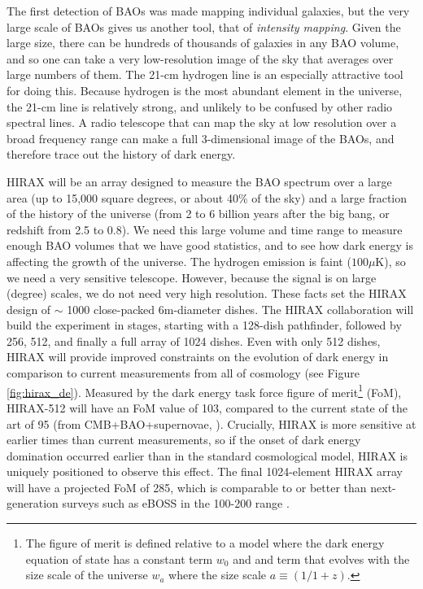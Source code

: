 \documentclass[11pt]{article}
\begin{document}
The first detection of BAOs \citep{Eisenstein05} was made mapping
individual galaxies, but the very large scale of BAOs gives us another
tool, that of {\textit{intensity mapping}}.  Given the large size,
there can be hundreds of thousands of galaxies in any BAO volume, and
so one can take a very low-resolution image of the sky that averages
over large numbers of them.  The 21-cm hydrogen line is an especially
attractive tool for doing this.  Because hydrogen is the most abundant
element in the universe, the 21-cm line is relatively strong, and
unlikely to be confused by other radio spectral lines.  A radio
telescope that can map the sky at low resolution over a broad
frequency range can make a full 3-dimensional image of the BAOs, and
therefore trace out the history of dark energy.

HIRAX will be an array designed to measure the BAO spectrum over a
large area (up to 15,000 square degrees, or about 40\% of the sky) and
a large fraction of the history of the universe (from 2 to 6 billion
years after the big bang, or redshift from 2.5 to 0.8).  We need this
large volume and time range to measure enough BAO volumes that we have
good statistics, and to see how dark energy is affecting the growth of
the universe.  The hydrogen emission is faint ($100 \mu \mathrm{K}$),
so we need a very sensitive telescope.  However, because the signal is
on large (degree) scales, we do not need very high resolution.  These
facts set the HIRAX design of $\sim$ 1000 close-packed 6m-diameter
dishes.  The HIRAX collaboration will build the experiment in stages,
starting with a 128-dish pathfinder, followed by 256, 512, and finally a
full array of 1024 dishes.  Even with only 512 dishes, HIRAX will
provide improved constraints on the evolution of dark energy in
comparison to current measurements from all of cosmology (see Figure
\ref{fig:hirax_de}).  Measured by the dark energy task force figure of
merit\footnote{The figure of merit is defined relative to a model
  where the dark energy equation of state has a constant term $w_0$
  and and term that evolves with the size scale of the universe $w_a$
  where the size scale $a\equiv(1/1+z)$.}  (FoM), HIRAX-512 will have
an FoM value of 103, compared to the current state of the art of 95
(from CMB+BAO+supernovae, \citet{Planck2018Params}).  Crucially, HIRAX
is more sensitive at earlier times than current measurements, so if
the onset of dark energy domination occurred earlier than in the
standard cosmological model, HIRAX is uniquely positioned to observe
this effect.  The final 1024-element HIRAX array will have a projected
FoM of 285, which is comparable to or better than next-generation
surveys such as eBOSS in the 100-200 range \citep{Zhao2016}.
\end{document}
